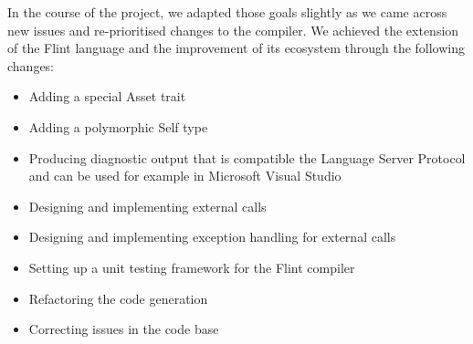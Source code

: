 In the course of the project, we adapted those goals slightly as we came across new issues and re-prioritised changes to the compiler. We achieved the extension of the Flint language and the improvement of its ecosystem through the following changes:

\begin{itemize}
	\item Adding a special Asset trait
	\item Adding a polymorphic Self type
	\item Producing diagnostic output that is compatible the Language Server Protocol and can be used for example in Microsoft Visual Studio
	\item Designing and implementing external calls
	\item Designing and implementing exception handling for external calls
	\item Setting up a unit testing framework for the Flint compiler
	\item Refactoring the code generation
	\item Correcting issues in the code base
\end{itemize}
